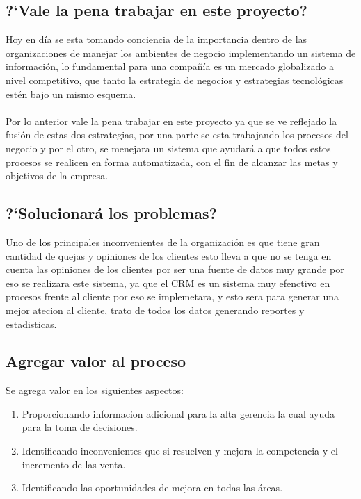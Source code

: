 \subsection{?`Vale la pena trabajar en este proyecto?}
Hoy en d\'ia se esta tomando conciencia de la importancia dentro de las organizaciones de manejar los ambientes de negocio implementando un sistema de informaci\'on, lo fundamental para una compa\~n\'ia es un mercado globalizado a nivel competitivo, que tanto la estrategia de negocios y estrategias tecnol\'ogicas est\'en bajo un mismo esquema.%
\\%
\\%
Por lo anterior vale la pena trabajar en este proyecto ya que se ve reflejado la fusi\'on de estas dos estrategias, por una parte se esta trabajando los procesos del negocio y por el otro, se menejara un sistema que ayudar\'a a que todos estos procesos se realicen en forma automatizada, con el fin de alcanzar las metas y objetivos de la empresa.%
%
\subsection{?`Solucionar\'a los problemas?}
Uno de los principales inconvenientes de la organizaci\'on es que tiene gran cantidad de quejas y opiniones de los clientes esto lleva a que no se tenga en cuenta las opiniones de los clientes por ser una fuente de datos muy grande por eso se realizara este sistema, ya que el CRM es un sistema muy efenctivo en procesos frente al cliente por eso se implemetara, y esto sera para generar una mejor atecion al cliente, trato de todos los datos generando reportes y estadisticas.%
%
\subsection{Agregar valor al proceso}
Se agrega valor en los siguientes aspectos:%
\begin{enumerate}
	\item Proporcionando informacion adicional para la alta gerencia la cual ayuda para la toma de decisiones.
	\item Identificando inconvenientes que si resuelven y mejora la competencia y el incremento de las venta.
	\item Identificando las oportunidades de mejora en todas las \'areas.
\end{enumerate}%
%
